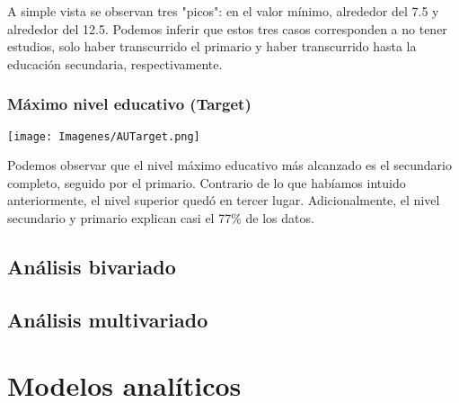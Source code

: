 \documentclass[a4paper]{article}
\begin{document}
            A simple vista se observan tres "picos": en el valor mínimo, alrededor del 7.5 y alrededor del 12.5. Podemos inferir que estos tres casos corresponden a no tener estudios, solo haber transcurrido el primario y haber transcurrido hasta la educación secundaria, respectivamente.
            
            \subsubsection{Máximo nivel educativo (Target)}
            
            \begin{center}
                \texttt{[image: Imagenes/AUTarget.png]}    
            \end{center}
            
            Podemos observar que el nivel máximo educativo más alcanzado es el secundario completo, seguido por el primario. Contrario de lo que habíamos intuido anteriormente, el nivel superior quedó en tercer lugar. Adicionalmente, el nivel secundario y primario explican casi el 77\% de los datos.

    \subsection{Análisis bivariado}

    \subsection{Análisis multivariado}

\section{Modelos analíticos}
\end{document}
